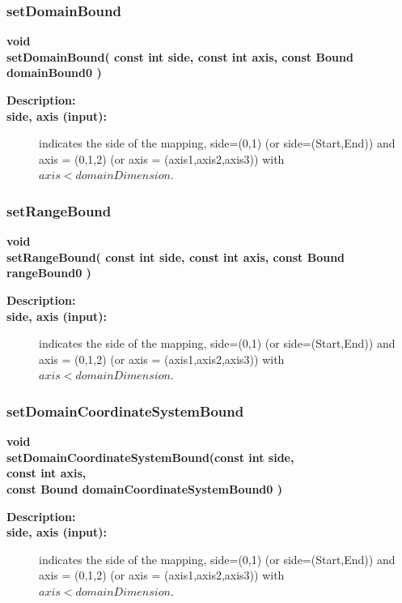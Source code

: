 \subsubsection{setDomainBound}
 
\begin{flushleft} \textbf{%
void  \\ 
\settowidth{\MappingIncludeArgIndent}{setDomainBound(}%
setDomainBound( const int side, const int axis, const Bound domainBound0 )
}\end{flushleft}
\begin{description}
\item[{\bf Description:}] 
\item[{\bf side, axis (input):}]  indicates the side of the mapping, side=(0,1) (or side=(Start,End)) 
     and axis = (0,1,2) (or axis = (axis1,axis2,axis3)) with $axis<domainDimension$.
\end{description}
\subsubsection{setRangeBound}
 
\begin{flushleft} \textbf{%
void  \\ 
\settowidth{\MappingIncludeArgIndent}{setRangeBound(}%
setRangeBound( const int side, const int axis, const Bound rangeBound0 )
}\end{flushleft}
\begin{description}
\item[{\bf Description:}] 
\item[{\bf side, axis (input):}]  indicates the side of the mapping, side=(0,1) (or side=(Start,End)) 
     and axis = (0,1,2) (or axis = (axis1,axis2,axis3)) with $axis<domainDimension$.
\end{description}
\subsubsection{setDomainCoordinateSystemBound}
 
\begin{flushleft} \textbf{%
void  \\ 
\settowidth{\MappingIncludeArgIndent}{setDomainCoordinateSystemBound(}%
setDomainCoordinateSystemBound(const int side, \\ 
\hspace{\MappingIncludeArgIndent}const int axis, \\ 
\hspace{\MappingIncludeArgIndent}const Bound domainCoordinateSystemBound0 )
}\end{flushleft}
\begin{description}
\item[{\bf Description:}] 
\item[{\bf side, axis (input):}]  indicates the side of the mapping, side=(0,1) (or side=(Start,End)) 
     and axis = (0,1,2) (or axis = (axis1,axis2,axis3)) with $axis<domainDimension$.
\end{description}
